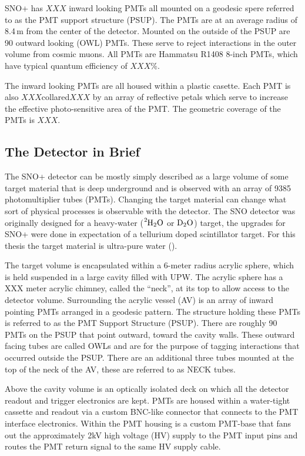 SNO+ has $XXX$ inward looking PMTs all mounted on a geodesic spere referred to as
the PMT support structure (PSUP). The PMTs are at an average radius of 8.4\,m from
the center of the detector.
Mounted on the outside of the PSUP are 90 outward looking (OWL) PMTs.
These serve to reject interactions in the outer volume from cosmic muons.
All PMTs are Hammatsu R1408 8-inch PMTs, which have typical quantum efficiency
of  $XXX$\%.

The inward looking PMTs are all housed within a plastic casette.
Each PMT is also $XXX$collared$XXX$ by an array of reflective
petals which serve to increase the effective photo-sensitive area
of the PMT.
The geometric coverage of the PMTs is $XXX$. %



\subsection{The Detector in Brief}
The SNO+ detector can be mostly simply described as a large volume of some
target material that is deep underground and is observed with an array of
9385  photomultiplier tubes (PMTs).
Changing the target material can change what sort of physical processes is
observable with the detector.
The SNO detector was originally designed for a heavy-water ($\ce{^{2}H_{2}O}$ or $\ce{D_{2}O}$)
target, the upgrades for SNO+ were done in expectation of a tellurium doped
scintillator target.
For this thesis the target material is ultra-pure water ().

The target volume is encapsulated within a 6-meter radius acrylic sphere,
which is held suspended in a large cavity filled with UPW.
The acrylic sphere has a XXX meter acrylic chimney, called the ``neck'', at its top
to allow access to the detector volume.
Surrounding the acrylic vessel (AV) is an  array of inward pointing PMTs
arranged in a geodesic pattern.
The structure holding these PMTs is referred to as the PMT Support Structure
(PSUP).
There are roughly 90 PMTs on the PSUP that point outward, toward the cavity
walls.
These outward facing tubes are called OWLs and are for the purpose of tagging
interactions that occurred outside the PSUP.
There are an additional three tubes mounted at the top of the neck of the AV,
these are referred to as NECK tubes.

Above the cavity volume is an optically isolated deck on which all the detector
readout and trigger electronics are kept.
PMTs are housed within a water-tight cassette and readout via a custom BNC-like
connector that connects to the PMT interface electronics.
Within the PMT housing is a custom PMT-base that fans out the approximately 2kV
high voltage (HV) supply to the PMT input pins and routes the PMT return signal to the same
HV supply cable.





